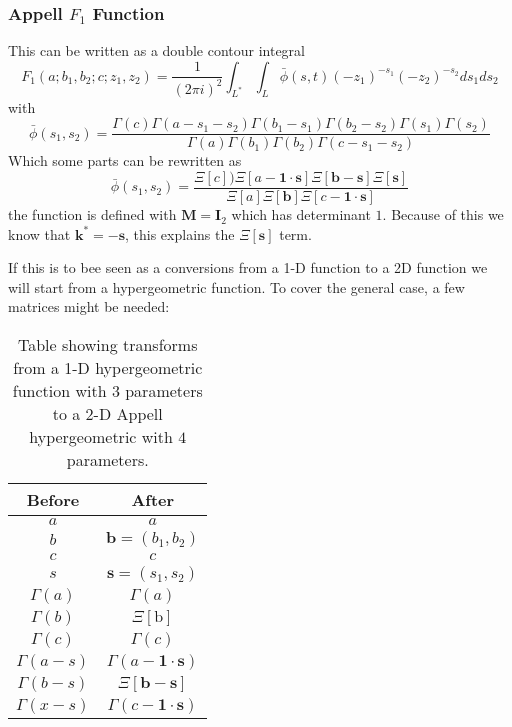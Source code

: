 \documentclass[journal=jcisd8,manuscript=article,layout=onecolumn,pdftex,floatfix,amsmath,amssymb,10pt]{achemso}
\begin{document}
\subsubsection{Appell $F_1$ Function}
This can be written as a double contour integral
\begin{equation}
F_1(a;b_1,b_2;c;z_1,z_2) = \frac{1}{(2\pi i)^2}\int_{L^*} \int_L  \bar{\phi}(s,t) (-z_1)^{-s_1}(-z_2)^{-s_2} ds_1 ds_2
\end{equation}
with \begin{equation}
\bar{\phi}(s_1,s_2) = \frac{\Gamma(c)\Gamma(a-s_1-s_2)\Gamma(b_1-s_1)\Gamma(b_2-s_2)\Gamma(s_1)\Gamma(s_2)}{\Gamma(a)\Gamma(b_1)\Gamma(b_2)\Gamma(c-s_1-s_2)}
\end{equation}
Which some parts can be rewritten as 
\begin{equation}
\bar{\phi}(s_1,s_2) = \frac{\Xi[c])\Xi[a-\mathbf{1}\cdot\mathbf{s}]\Xi[\mathbf{b}-\mathbf{s}]\Xi[\mathbf{s}]}{\Xi[a]\Xi[\mathbf{b}]\Xi[c-\mathbf{1}\cdot\mathbf{s}]}
\end{equation}
the function is defined with $\mathbf{M}=\mathbf{I}_2$ which has determinant $1$. Because of this we know that $\mathbf{k}^* = -\mathbf{s}$, this explains the $\Xi[\mathbf{s}]$ term.

If this is to bee seen as a conversions from a 1-D function to a 2D function we will start from a hypergeometric function. To cover the general case, a few matrices might be needed:
\begin{table}
\begin{tabular}{|c|c|}
\hline
Before & After \\
\hline
$a$ & $a$ \\
$b$ & $\mathbf{b}=(b_1,b_2)$ \\
$c$ & $c$ \\
$s$ & $\mathbf{s} = (s_1,s_2)$ \\
\hline
$\Gamma(a)$ & $\Gamma(a)$\\
$\Gamma(b)$ & $\Xi[\mathrm{b}]$ \\
$\Gamma(c)$ & $\Gamma(c)$\\
\hline
$\Gamma(a-s)$ & $\Gamma(a - \mathbf{1}\cdot\mathbf{s})$\\
$\Gamma(b-s)$ & $\Xi[\mathbf{b-s}]$ \\
$\Gamma(x-s)$ & $\Gamma(c - \mathbf{1}\cdot\mathbf{s})$\\
\hline
\end{tabular}
\caption{Table showing transforms from a 1-D hypergeometric function with $3$ parameters to a 2-D Appell hypergeometric with $4$ parameters. }
\label{tab:1dto2d}
\end{table}
\end{document}

